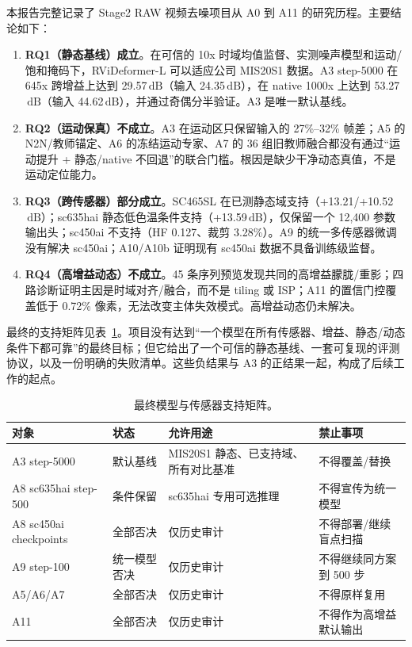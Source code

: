 \documentclass[11pt,a4paper,UTF8,fontset=fandol]{ctexart}
\newcommand{\db}{\ensuremath{\,\mathrm{dB}}}
\begin{document}
本报告完整记录了 Stage2 RAW 视频去噪项目从 A0 到 A11 的研究历程。主要结论如下：

\begin{enumerate}
  \item \textbf{RQ1（静态基线）成立}。在可信的 10x 时域均值监督、实测噪声模型和运动/饱和掩码下，RViDeformer-L 可以适应公司 MIS20S1 数据。A3 step-5000 在 645x 跨增益上达到 29.57\db（输入 24.35\db），在 native 1000x 上达到 53.27\db（输入 44.62\db），并通过奇偶分半验证。A3 是唯一默认基线。
  \item \textbf{RQ2（运动保真）不成立}。A3 在运动区只保留输入的 27\%--32\% 帧差；A5 的 N2N/教师锚定、A6 的冻结运动专家、A7 的 36 组旧教师融合都没有通过“运动提升 + 静态/native 不回退”的联合门槛。根因是缺少干净动态真值，不是运动定位能力。
  \item \textbf{RQ3（跨传感器）部分成立}。SC465SL 在已测静态域支持（+13.21/+10.52\db）；sc635hai 静态低色温条件支持（+13.59\db），仅保留一个 12,400 参数输出头；sc450ai 不支持（HF 0.127、裁剪 3.28\%）。A9 的统一多传感器微调没有解决 sc450ai；A10/A10b 证明现有 sc450ai 数据不具备训练级监督。
  \item \textbf{RQ4（高增益动态）不成立}。45 条序列预览发现共同的高增益朦胧/重影；四路诊断证明主因是时域对齐/融合，而不是 tiling 或 ISP；A11 的置信门控覆盖低于 0.72\% 像素，无法改变主体失效模式。高增益动态仍未解决。
\end{enumerate}

最终的支持矩阵见表~\ref{tab:support}。项目没有达到“一个模型在所有传感器、增益、静态/动态条件下都可靠”的最终目标；但它给出了一个可信的静态基线、一套可复现的评测协议，以及一份明确的失败清单。这些负结果与 A3 的正结果一起，构成了后续工作的起点。

\begin{table}[H]
\centering
\small
\caption{最终模型与传感器支持矩阵。}
\label{tab:support}
\begin{tabular}{p{}p{}p{}p{}}
\toprule
对象 & 状态 & 允许用途 & 禁止事项 \\
\midrule
A3 step-5000 & 默认基线 & MIS20S1 静态、已支持域、所有对比基准 & 不得覆盖/替换 \\
A8 sc635hai step-500 & 条件保留 & sc635hai 专用可选推理 & 不得宣传为统一模型 \\
A8 sc450ai checkpoints & 全部否决 & 仅历史审计 & 不得部署/继续盲点扫描 \\
A9 step-100 & 统一模型否决 & 仅历史审计 & 不得继续同方案到 500 步 \\
A5/A6/A7 & 全部否决 & 仅历史审计 & 不得原样复用 \\
A11 & 全部否决 & 仅历史审计 & 不得作为高增益默认输出 \\
\bottomrule
\end{tabular}
\end{table}
\end{document}
